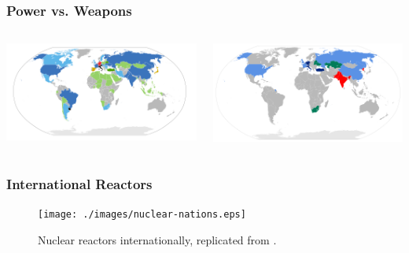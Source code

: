 \begin{frame}
  \frametitle{Power vs. Weapons}
        \begin{columns}
        \begin{center}
      \includegraphics[width=\textwidth]{./images/nuclear-nations-map.png}\\
    \end{center}
\hspace{-1in}
                \begin{center}
		      \includegraphics[width=\textwidth]{./images/nuclear-weapons-map.png}
                \end{center}
        \end{columns}
\end{frame}        

\begin{frame}
  \frametitle{International Reactors}
  \begin{figure}[htbp!]
    \begin{center}
      \texttt{[image: ./images/nuclear-nations.eps]}
    \end{center}
          \caption{Nuclear reactors internationally, replicated from 
          \cite{iaea_country_2015}.}
    \label{fig:nuc-nations}
  \end{figure}
\end{frame}

